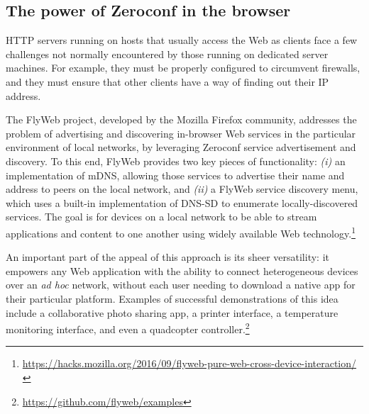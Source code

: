 \subsection{The power of Zeroconf in the browser}
\label{sec:background_flyweb}

HTTP servers running on hosts that usually access the Web as clients face a few challenges not normally encountered by those running on dedicated server machines.
For example, they must be properly configured to circumvent firewalls, and they must ensure that other clients have a way of finding out their IP address.

The FlyWeb project, developed by the Mozilla Firefox community, addresses the problem of advertising and discovering in-browser Web services in the particular environment of local networks, by leveraging Zeroconf service advertisement and discovery.
To this end, FlyWeb provides two key pieces of functionality: 
\textit{(i)} an implementation of mDNS, allowing those services to advertise their name and address to peers on the local network, and 
\textit{(ii)} a FlyWeb service discovery menu, which uses a built-in implementation of DNS-SD to enumerate locally-discovered services.
The goal is for devices on a local network to be able to stream applications and content to one another using widely available Web technology.\footnote{\url{https://hacks.mozilla.org/2016/09/flyweb-pure-web-cross-device-interaction/}}

An important part of the appeal of this approach is its sheer versatility: it empowers any Web application with the ability to connect heterogeneous devices over an \textit{ad hoc} network, without each user needing to download a native app for their particular platform.
Examples of successful demonstrations of this idea include a collaborative photo sharing app, a printer interface, a temperature monitoring interface, and even a quadcopter controller.\footnote{\url{https://github.com/flyweb/examples}}
